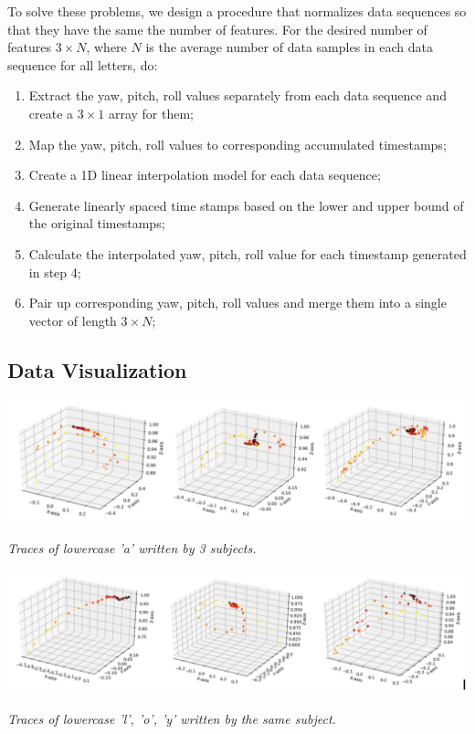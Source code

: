 \documentclass{article}
\begin{document}
To solve these problems, we design a procedure that normalizes data sequences so that they have the same the number of features. For the desired number of features $3 \times N$, where $N$ is the average number of data samples in each data sequence for all letters, do:

\begin{enumerate}
    \item Extract the yaw, pitch, roll values separately from each data sequence and create a $3\times1$ array for them;
    \item Map the yaw, pitch, roll values to corresponding accumulated timestamps;
    \item Create a 1D linear interpolation model for each data sequence;
    \item Generate linearly spaced time stamps based on the lower and upper bound of the original timestamps;
    \item Calculate the interpolated yaw, pitch, roll value for each timestamp generated in step 4;
    \item Pair up corresponding yaw, pitch, roll values and merge them into a single vector of length $3 \times N$;
\end{enumerate}



\subsection{Data Visualization}

\begin{center}
    \includegraphics[scale=0.2]{a-3-subject.png}
    
    \textit{Traces of lowercase 'a' written by 3 subjects.}
\end{center}

\begin{center}
    \includegraphics[scale=0.2]{loy.png}
    
    \textit{Traces of lowercase 'l', 'o', 'y' written by the same subject.}
\end{center}
\end{document}
